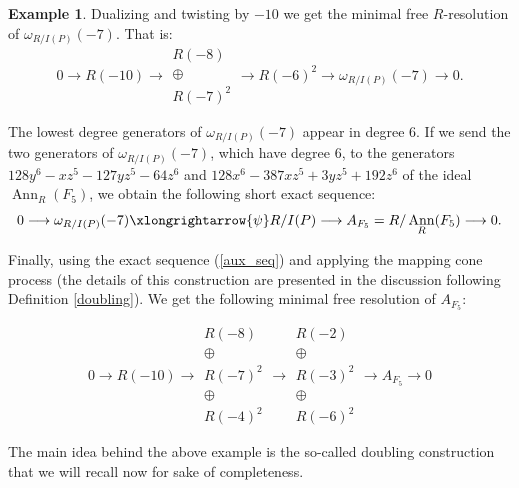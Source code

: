 \documentclass[12pt,twoside]{amsart}
\numberwithin{equation}{section} \hyphenation{semi-stable}
\DeclareMathOperator{\ann}{Ann}
\theoremstyle{definition}
\newtheorem{example}[theorem]{Example}
\begin{document}
\begin{example}
       Dualizing and twisting by $-10$ we get the minimal free $R$-resolution of $\omega_{R/I(P)}(-7)$. That is:
    $$
    0 \longrightarrow R(-10) \longrightarrow \begin{array}{c} R(-8) \\ \oplus \\ R(-7)^2 \end{array} \longrightarrow R(-6)^2 \longrightarrow \omega_{R/I(P)}(-7) \longrightarrow 0.
    $$

The lowest degree generators of $\omega_{R/I(P)}(-7)$ appear in degree 6. If we send the two generators of $\omega_{R/I(P)}(-7)$, which have degree $6$, to the generators $128y^6-
      xz^5-127yz^5-64z^6$ and $128x^6-387xz^5+3yz^5+192z^6$ of the ideal $\ann_R(F_5)$, we obtain the following short exact sequence:
    \begin{equation}\label{aux_seq}     
 0 \longrightarrow \omega_{R/I(P)}(-7) \xlongrightarrow{\psi} R/I(P) \longrightarrow A_{F_5}=R/\ann_R(F_5)\longrightarrow 0.
       \end{equation}

       Finally, using the exact sequence (\ref{aux_seq}) and applying the mapping cone process (the details of this construction are presented in the discussion following Definition \ref{doubling}). We get the following minimal free resolution of $A_{F_5}$:

           $$
    0 \longrightarrow R(-10) \longrightarrow \begin{array}{c} R(-8) \\ \oplus \\ R(-7)^2 \\ \oplus \\ R(-4)^2 \end{array} \longrightarrow 
     \begin{array}{c} R(-2) \\ \oplus \\ R(-3)^2  \\ \oplus \\ R(-6)^2 \end{array} 
 \longrightarrow A_{F_5} \longrightarrow 0
    $$
 \end{example}

The main idea behind the above example is the so-called doubling construction that we will recall now for sake of completeness.
\end{document}
